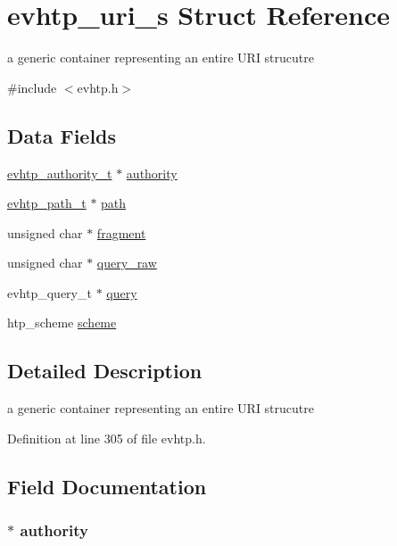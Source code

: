 \hypertarget{structevhtp__uri__s}{
\section{evhtp\_\-uri\_\-s Struct Reference}
\label{structevhtp__uri__s}
}


a generic container representing an entire URI strucutre  




{\ttfamily \#include $<$evhtp.h$>$}

\subsection*{Data Fields}
\begin{DoxyCompactItemize}
\item 
\hyperlink{structevhtp__authority__s}{evhtp\_\-authority\_\-t} $\ast$ \hyperlink{structevhtp__uri__s_a733fe801dc0ac5ace86975d137f95e90}{authority}
\item 
\hyperlink{structevhtp__path__s}{evhtp\_\-path\_\-t} $\ast$ \hyperlink{structevhtp__uri__s_af5dec3b872833197fa6e19e681e8a50b}{path}
\item 
unsigned char $\ast$ \hyperlink{structevhtp__uri__s_a3c28c1d14341a7ab7ceb5600b7d353ae}{fragment}
\item 
unsigned char $\ast$ \hyperlink{structevhtp__uri__s_ab78fb0297ee5380de7fe7087c2dada1b}{query\_\-raw}
\item 
evhtp\_\-query\_\-t $\ast$ \hyperlink{structevhtp__uri__s_ade25f426b13f051ad7fe2feacbcdf44e}{query}
\item 
htp\_\-scheme \hyperlink{structevhtp__uri__s_ad585f48c56bdcc852338aa35466e3f8d}{scheme}
\end{DoxyCompactItemize}


\subsection{Detailed Description}
a generic container representing an entire URI strucutre 

Definition at line 305 of file evhtp.h.



\subsection{Field Documentation}
\hypertarget{structevhtp__uri__s_a733fe801dc0ac5ace86975d137f95e90}{
\subsubsection[{authority}]{$\ast$ {\bf authority}}}
\label{structevhtp__uri__s_a733fe801dc0ac5ace86975d137f95e90}


